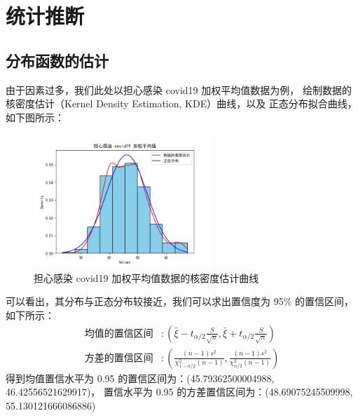 \documentclass[UTF8,ctexart,a4paper,11pt,openany]{article}
\theoremstyle{definition}
\begin{document}
\section{统计推断}
\subsection{分布函数的估计}
由于因素过多，我们此处以担心感染 covid19 加权平均值数据为例，
绘制数据的核密度估计（Kernel Density Estimation, KDE）曲线，以及
正态分布拟合曲线，如下图所示：
\begin{figure}[H]
\centering
\includegraphics[width=0.6\textwidth]{Figure_3.png}
\caption{担心感染 covid19 加权平均值数据的核密度估计曲线}
\label{fig:kde}
\end{figure}
可以看出，其分布与正态分布较接近，我们可以求出置信度为
95\% 的置信区间，如下所示：
\begin{align*}
\text{均值的置信区间} & : \left( \bar{\xi} - t_{\alpha/2} \frac{S}{\sqrt{n}}, \bar{\xi} + t_{\alpha/2} \frac{S}{\sqrt{n}} \right) \\
\text{方差的置信区间} & : \left( \frac{(n-1)s^2}{\chi^2_{1-\alpha/2}(n-1)}, \frac{(n-1)s^2}{\chi^2_{\alpha/2}(n-1)} \right)
\end{align*}
得到均值置信水平为 0.95 的置信区间为：(45.79362500004988, 46.42556521629917)，
置信水平为 0.95 的方差置信区间为：(48.69075245509998, 55.130121666086886)
\end{document}
